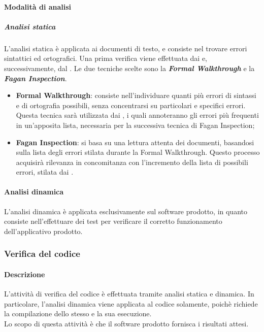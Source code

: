 		\paragraph{Modalità di analisi}
			\subparagraph{Analisi statica}
			L'analisi statica è applicata ai documenti di testo, e consiste nel trovare errori sintattici ed ortografici. Una prima verifica viene effettuata dai \textit{\Vers} e, successivamente, dal \textit{\RdP}. Le due tecniche scelte sono la \textbf{\textit{Formal Walkthrough}} e la \textbf{\textit{Fagan Inspection}}.
			\begin{itemize}
				\item \textbf{Formal Walkthrough}: consiste nell'individuare quanti più errori di sintassi e di ortografia possibili, senza concentrarsi su particolari e specifici errori. Questa tecnica sarà utilizzata dai \textit{\Vers}, i quali annoteranno gli errori più frequenti in un'apposita lista, necessaria per la successiva tecnica di Fagan Inspection;
				\item \textbf{Fagan Inspection}: si basa su una lettura attenta dei documenti, basandosi sulla lista degli errori stilata durante la Formal Walkthrough. Questo processo acquisirà rilevanza in concomitanza con l'incremento della lista di possibili errori, stilata dai \textit{\Vers}.
			\end{itemize}

			\paragraph{Analisi dinamica}
			L'analisi dinamica è applicata esclusivamente sul software prodotto, in quanto consiste nell'effettuare dei test per verificare il corretto funzionamento dell'applicativo prodotto.
	
		\subsubsection{Verifica del codice}
		
		\paragraph{Descrizione}
		L’attività di verifica del codice è effettuata tramite analisi statica e dinamica. In particolare, l'analisi dinamica viene applicata al codice solamente, poichè richiede la compilazione dello stesso e la sua esecuzione.\\
		Lo scopo di questa attività è che il software prodotto fornisca i risultati attesi.
		
